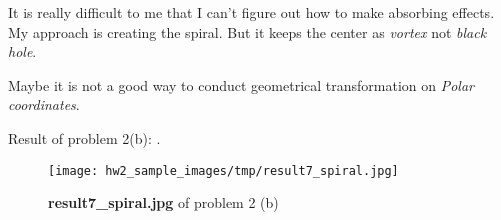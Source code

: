 It is really difficult to me that I can't figure out how to make \alert{absorbing effects}. My approach is creating the \alert{spiral}. But it keeps the center as \textit{vortex} not \textit{black hole}.

Maybe it is not a good way to conduct geometrical transformation on \textit{Polar coordinates}.

Result of problem 2(b): .
\begin{figure}
    \centering
    \texttt{[image: hw2\_sample\_images/tmp/result7\_spiral.jpg]}
    \caption{\textbf{result7\_spiral.jpg} of problem 2 (b)}
    \label{result7_s}
\end{figure}
